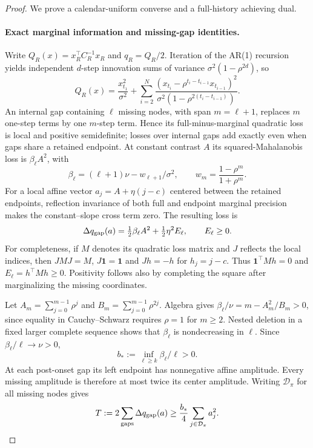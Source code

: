\begin{proof}
We prove a calendar-uniform converse and a full-history achieving dual.

\paragraph{Exact marginal information and missing-gap identities.}
Write $Q_R(x)=x_R^\top C_R^{-1}x_R$ and $q_R=Q_R/2$.
Iteration of the AR(1) recursion yields independent $d$-step innovation
sums of variance $\sigma^2(1-\rho^{2d})$, so
\begin{equation}\label{eq:ar1-markov}
 Q_R(x)=\frac{x_{t_1}^2}{\sigma^2}
 +\sum_{i=2}^N\frac{(x_{t_i}-\rho^{t_i-t_{i-1}}x_{t_{i-1}})^2}
 {\sigma^2(1-\rho^{2(t_i-t_{i-1})})}.
\end{equation}
An internal gap containing $\ell$ missing nodes, with span $m=\ell+1$,
replaces $m$ one-step terms by one $m$-step term. Hence its full-minus-marginal
quadratic loss is local and positive semidefinite; losses over internal gaps
add exactly even when gaps share a retained endpoint. At constant contrast
$A$ its squared-Mahalanobis loss is $\beta_\ell A^2$, with
\begin{equation}\label{eq:ar1-all-beta}
 \beta_\ell=(\ell+1)\nu-w_{\ell+1}/\sigma^2,\qquad
 w_m=\frac{1-\rho^m}{1+\rho^m}.
\end{equation}
For a local affine vector $a_j=A+\eta(j-c)$ centered between the retained
endpoints, reflection invariance of both full and endpoint marginal
precision makes the constant--slope cross term zero. The resulting loss is
\begin{equation}\label{eq:ar1-affine-gap}
 \Delta q_{\rm gap}(a)=\tfrac12\beta_\ell A^2+\tfrac12\eta^2E_\ell,
 \qquad E_\ell\ge0.
\end{equation}
For completeness, if $M$ denotes its quadratic loss matrix and $J$ reflects
the local indices, then $JMJ=M$, $J\mathbf1=\mathbf1$ and $Jh=-h$ for
$h_j=j-c$. Thus $\mathbf1^\top Mh=0$ and $E_\ell=h^\top Mh\ge0$.
Positivity follows also by completing the square after marginalizing the
missing coordinates.

Let $A_m=\sum_{j=0}^{m-1}\rho^j$ and $B_m=\sum_{j=0}^{m-1}\rho^{2j}$.
Algebra gives $\beta_\ell/\nu=m-A_m^2/B_m>0$, since equality in
Cauchy--Schwarz requires $\rho=1$ for $m\ge2$.
Nested deletion in a fixed larger complete sequence shows that
$\beta_\ell$ is nondecreasing in $\ell$. Since $\beta_\ell/\ell\to\nu>0$,
\begin{equation}\label{eq:ar1-bstar}
 b_*:=\inf_{\ell\ge k}\beta_\ell/\ell>0.
\end{equation}
At each post-onset gap its left endpoint has nonnegative affine amplitude.
Every missing amplitude is therefore at most twice its center amplitude.
Writing $\mathcal D_\pi$ for all missing nodes gives
\begin{equation}\label{eq:ar1-dead-budget}
 T:=2\sum_{\rm gaps}\Delta q_{\rm gap}(a)
 \ge\frac{b_*}{4}\sum_{j\in\mathcal D_\pi}a_j^2.
\end{equation}


\end{proof}
